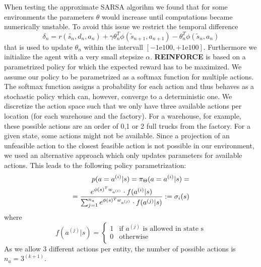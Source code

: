 \documentclass[journal, a4paper]{IEEEtran}
\theoremstyle{plain}
\theoremstyle{definition}
\begin{document}
When testing the approximate SARSA algorihm we found that for some environments the parameters $\theta$ would increase until computations became numerically unstable. To avoid this issue we restrict the temporal difference
\begin{equation}
	\delta_n = r(\tilde{s_n}, d_n, a_n) + \gamma \theta_n^T \phi(\tilde{s}_{n+1}, a_{n+1}) - \theta_n^T\phi(\tilde{s}_n, a_n)
\end{equation}
that is used to update $\theta_n$ within the intervall $[-1\mathrm{e}{100}, +1\mathrm{e}{100}]$. Furthermore we initialize the agent with a very small stepsize $\alpha$. 
\textbf{REINFORCE} is based on a parametrized policy for which the expected reward has to be maximized. We assume our policy to be parametrized as a softmax function for multiple actions. The softmax function assigns a probability for each action and thus behaves as a stochastic policy which can, however, converge to a deterministic one. 
We discretize the action space such that we only have three available actions per location (for each warehouse and the factory). For a warehouse, for example, these possible actions are an order of  0,1 or 2 full trucks from the factory. For a given state, some actions might not be available. Since a projection of an unfeasible action to the closest feasible action is not possible in our environment, we used an alternative approach which only updates parameters for available actions. 
This leads to the following policy parametrization:
\begin{align}
    \label{simple_equation}
    p( a = a^{(i)}| s) = \pi_\Theta(a = a^{(i)}|s) =
    \notag
    \\
     =\frac{e^{\phi(s)^T w_{a^{(i)}}}\cdot f(a^{(i)}|s)}{\sum_{j=1}^{n_a} e^{\phi(s)^T w_{a^{(j)}}}\cdot f(a^{(j)}|s)} 
     :=
     \sigma_i(s)
\end{align}
where 
\begin{equation}
   f(a^{(j)}|s) =
   \begin{cases}
     1 & \text{if $a^{(j)}$ is allowed in state s} \\
     0 & \text{otherwise} \\ 
   \end{cases}
\end{equation}
As we allow 3 different actions per entity, the number of possible actions is $n_a = 3^{(k+1)}$. 
\end{document}
